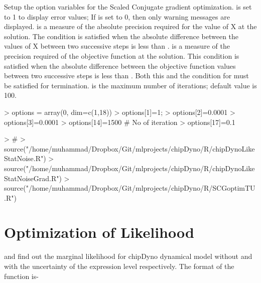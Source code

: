 \documentclass{article}
\begin{document}
Setup the option variables for the Scaled Conjugate gradient optimization.  is set to 1 to display error values; If  is set to 0, then only warning messages are displayed.  is a measure of the absolute precision required for the value of X at the solution.  The condition is satisfied when the absolute difference between the values of X between two successive steps is less than .   is a measure of the precision required of the objective function at the solution.  This condition is satisfied when the absolute difference between the objective function values between two successive steps is less than . Both this and the condition for  must be satisfied for termination.  is the maximum number of iterations; default value is 100.

\begin{Schunk}
\begin{Sinput}
> options = array(0, dim=c(1,18))
> options[1]=1;
> options[2]=0.0001
> options[3]=0.0001
> options[14]=1500 # No of iteration
> options[17]=0.1
\end{Sinput}
\end{Schunk}


\begin{Schunk}
\begin{Sinput}
> #% Temporary load functions
> source("/home/muhammad/Dropbox/Git/mlprojects/chipDyno/R/chipDynoLikeStatNoise.R")
> source("/home/muhammad/Dropbox/Git/mlprojects/chipDyno/R/chipDynoLikeStatNoiseGrad.R")
> source("/home/muhammad/Dropbox/Git/mlprojects/chipDyno/R/SCGoptimTU.R")
\end{Sinput}
\end{Schunk}


\section{Optimization of Likelihood}

 and  find out the marginal likelihood for chipDyno dynamical model without and with the uncertainty of the expression level respectively.
The format of the function is-
\end{document}
